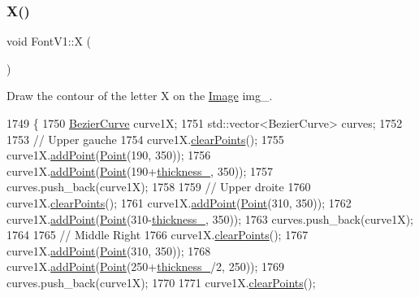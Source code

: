 \subsubsection{\texorpdfstring{X()}{X()}}
{\footnotesize\ttfamily void Font\+V1\+::X (\begin{DoxyParamCaption}{ }\end{DoxyParamCaption})}



Draw the contour of the letter X on the \mbox{\hyperlink{class_image}{Image}} img\+\_\+. 


\begin{DoxyCode}
1749               \{
1750     \mbox{\hyperlink{class_bezier_curve}{BezierCurve}} curve1X;
1751     std::vector<BezierCurve> curves;
1752 
1753     \textcolor{comment}{// Upper gauche}
1754     curve1X.\mbox{\hyperlink{class_bezier_curve_a0ba8ce66d5af5971ae6a1b506029728e}{clearPoints}}();
1755     curve1X.\mbox{\hyperlink{class_bezier_curve_a38d16c18b36ae45619b05e26e226cf34}{addPoint}}(\mbox{\hyperlink{class_point}{Point}}(190, 350));
1756     curve1X.\mbox{\hyperlink{class_bezier_curve_a38d16c18b36ae45619b05e26e226cf34}{addPoint}}(\mbox{\hyperlink{class_point}{Point}}(190+\mbox{\hyperlink{class_font_v1_aed8040e76be9a52833627b92f0fb4e5f}{thickness\_}}, 350));
1757     curves.push\_back(curve1X);
1758 
1759     \textcolor{comment}{// Upper droite}
1760     curve1X.\mbox{\hyperlink{class_bezier_curve_a0ba8ce66d5af5971ae6a1b506029728e}{clearPoints}}();
1761     curve1X.\mbox{\hyperlink{class_bezier_curve_a38d16c18b36ae45619b05e26e226cf34}{addPoint}}(\mbox{\hyperlink{class_point}{Point}}(310, 350));
1762     curve1X.\mbox{\hyperlink{class_bezier_curve_a38d16c18b36ae45619b05e26e226cf34}{addPoint}}(\mbox{\hyperlink{class_point}{Point}}(310-\mbox{\hyperlink{class_font_v1_aed8040e76be9a52833627b92f0fb4e5f}{thickness\_}}, 350));
1763     curves.push\_back(curve1X);
1764 
1765     \textcolor{comment}{// Middle Right}
1766     curve1X.\mbox{\hyperlink{class_bezier_curve_a0ba8ce66d5af5971ae6a1b506029728e}{clearPoints}}();
1767     curve1X.\mbox{\hyperlink{class_bezier_curve_a38d16c18b36ae45619b05e26e226cf34}{addPoint}}(\mbox{\hyperlink{class_point}{Point}}(310, 350));
1768     curve1X.\mbox{\hyperlink{class_bezier_curve_a38d16c18b36ae45619b05e26e226cf34}{addPoint}}(\mbox{\hyperlink{class_point}{Point}}(250+\mbox{\hyperlink{class_font_v1_aed8040e76be9a52833627b92f0fb4e5f}{thickness\_}}/2, 250));
1769     curves.push\_back(curve1X);
1770 
1771     curve1X.\mbox{\hyperlink{class_bezier_curve_a0ba8ce66d5af5971ae6a1b506029728e}{clearPoints}}();

\end{DoxyCode}
